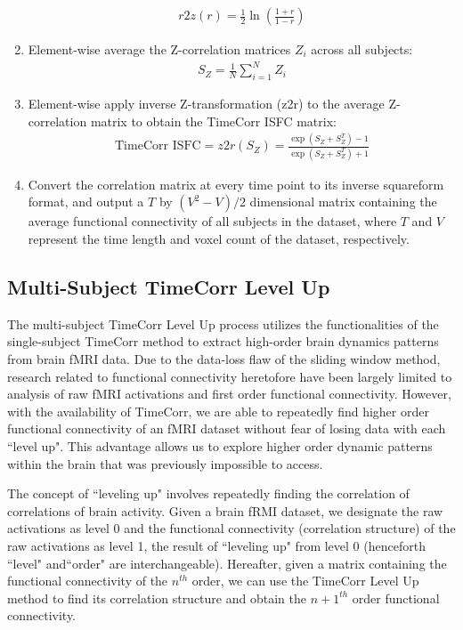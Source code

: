 \documentclass[11pt]{article}
\begin{document}
\begin{enumerate}
\begin{align*}
r2z(r) = \frac{1}{2}\ln(\frac{1+r}{1-r})
\end{align*}
\item Element-wise average the Z-correlation matrices $Z_i$ across all subjects:
\begin{align*}
S_Z = \frac{1}{N}\sum^N_{i=1}Z_i
\end{align*}
\item Element-wise apply inverse Z-transformation (z2r) to the average Z-correlation matrix to obtain the TimeCorr ISFC matrix:
\begin{align*}
\text{TimeCorr ISFC} = z2r(S_Z) = \frac{\exp(S_Z+S_Z^T)-1}{\exp(S_Z+S_Z^T)+1}
\end{align*}
\item Convert the correlation matrix at every time point to its inverse squareform format, and output a $T$ by $(V^2-V)/2$ dimensional matrix containing the average functional connectivity of all subjects in the dataset, where $T$ and $V$ represent the time length and voxel count of the dataset, respectively.
\end{enumerate}

\subsection{Multi-Subject TimeCorr Level Up}
The multi-subject TimeCorr Level Up process utilizes the functionalities of the single-subject TimeCorr method to extract high-order brain dynamics patterns from brain fMRI data. Due to the data-loss flaw of the sliding window method, research related to functional connectivity heretofore have been largely limited to analysis of raw fMRI activations and first order functional connectivity. However, with the availability of TimeCorr, we are able to repeatedly find higher order functional connectivity of an fMRI dataset without fear of losing data with each ``level up". This advantage allows us to explore higher order dynamic patterns within the brain that was previously impossible to access.

The concept of ``leveling up" involves repeatedly finding the correlation of correlations of brain activity. Given a brain fRMI dataset, we designate the raw activations as level 0 and the functional connectivity (correlation structure) of the raw activations as level 1, the result of ``leveling up" from level 0 (henceforth ``level" and``order" are interchangeable). Hereafter, given a matrix containing the functional connectivity of the $n^{th}$ order, we can use the TimeCorr Level Up method to find its correlation structure and obtain the $n+1^{th}$ order functional connectivity.
\end{document}
